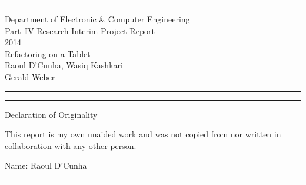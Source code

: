 \documentclass[11pt,twocolumn]{article}
\begin{document}
\begin{figure*}[!t]
\centering
\hrule
\vspace{1em}
Department of Electronic \& Computer Engineering \\
Part~{\scshape IV} Research Interim Project Report \\
2014 \\
Refactoring on a Tablet \\
Raoul D'Cunha, Wasiq Kashkari \\
Gerald Weber
\vspace{1em}
\hrule
\end{figure*}

\clearpage

\begin{figure*}[!t]
\centering
\hrule
\vspace{1em}
Declaration of Originality

This report is my own unaided work and was not copied from nor written in
collaboration with any other person.

\vspace{1em}

Name: Raoul D'Cunha
\vspace{1em}
\hrule
\end{figure*}

\clearpage







\makeatother
\end{document}

